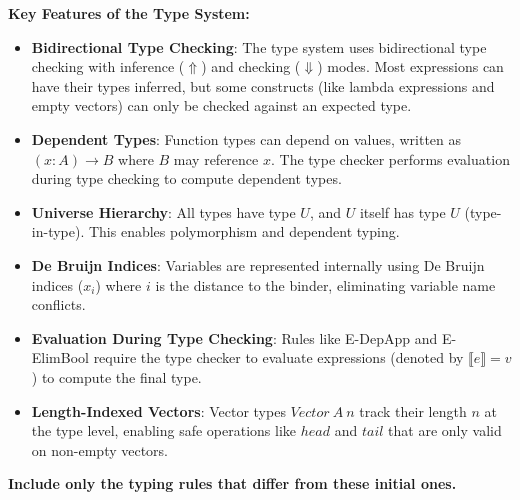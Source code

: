 \vspace{1em}\noindent
\textbf{Key Features of the Type System:}

\begin{itemize}
    \item \textbf{Bidirectional Type Checking}: The type system uses bidirectional type checking with inference ($\Uparrow$) and checking ($\Downarrow$) modes. Most expressions can have their types inferred, but some constructs (like lambda expressions and empty vectors) can only be checked against an expected type.
    
    \item \textbf{Dependent Types}: Function types can depend on values, written as $(x : A) \to B$ where $B$ may reference $x$. The type checker performs evaluation during type checking to compute dependent types.
    
    \item \textbf{Universe Hierarchy}: All types have type $U$, and $U$ itself has type $U$ (type-in-type). This enables polymorphism and dependent typing.
    
    \item \textbf{De Bruijn Indices}: Variables are represented internally using De Bruijn indices ($x_i$) where $i$ is the distance to the binder, eliminating variable name conflicts.
    
    \item \textbf{Evaluation During Type Checking}: Rules like E-DepApp and E-ElimBool require the type checker to evaluate expressions (denoted by $\llbracket e \rrbracket = v$) to compute the final type.
    
    \item \textbf{Length-Indexed Vectors}: Vector types $Vector\ A\ n$ track their length $n$ at the type level, enabling safe operations like $head$ and $tail$ that are only valid on non-empty vectors.
\end{itemize}

\vspace{1em}\noindent
\textbf{Include only the typing rules that differ from these initial ones.}
